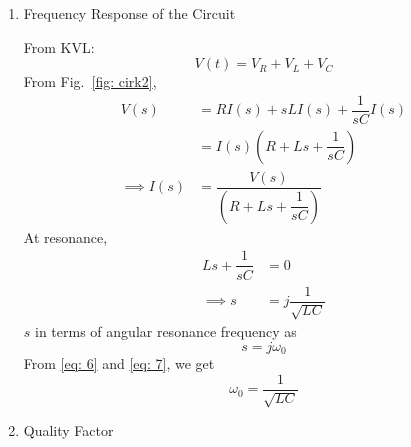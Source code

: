 \documentclass[journal,12pt,twocolumn]{IEEEtran}
\newcommand\figref{Fig.~\ref}
\theoremstyle{remark}
\begin{document}
\begin{enumerate}
\item {Frequency Response of the Circuit}

From KVL:
\begin{equation}
V(t) = V_R + V_L + V_C \label{eq:KVL}
\end{equation}
From \figref{fig: cirk2},
\begin{align}
    V(s) &= R I(s) + sL I(s) + \dfrac{1}{sC} I(s)\\
    &= I(s)\left(R + Ls + \dfrac{1}{sC}\right)\\
    \implies I(s) &= \dfrac{V(s)}{\left(R + Ls + \dfrac{1}{sC}\right)}\label{eq: 4}
\end{align}
At resonance,
\begin{align}
    Ls + \dfrac{1}{sC} &= 0\\
    \implies s &= j\dfrac{1}{\sqrt{LC}} \label{eq: 6}
\end{align}
$s$ in terms of angular resonance frequency as
\begin{equation}
    s = j\omega_0 \label{eq: 7}
\end{equation}
From \eqref{eq: 6} and \eqref{eq: 7}, we get
\begin{equation}
    \omega_0 = \dfrac{1}{\sqrt{LC}}
\end{equation}
\item{Quality Factor}


\end{enumerate}
\end{document}
